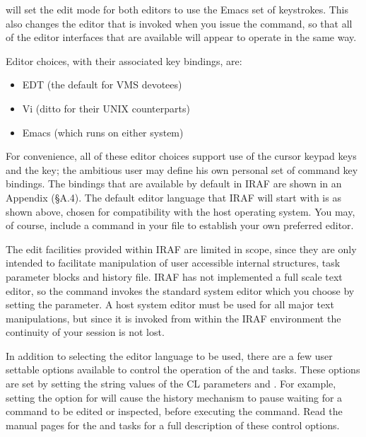 \begin{quotation}\noindent
{} 
\end{quotation}

\noindent
will set the edit mode for both editors to use the Emacs set of keystrokes.
This also changes the editor that is invoked when
you issue the  command, so that all of the editor interfaces
that are available will appear to operate in the same way. 

Editor choices, with their associated key bindings, are:

\begin{itemize}
\item EDT (the default for VMS devotees) 
\item Vi (ditto for their UNIX counterparts)
\item Emacs (which runs on either system)
\end{itemize}

For convenience, all of these editor choices support
use of the cursor keypad keys and the  key; the 
ambitious user may define his own personal set of command key bindings. 
The bindings that are available by default in IRAF are shown in an
Appendix (\S A.4).  The default editor language that IRAF will start 
with is as shown above, chosen for compatibility with the host operating
system.  You may, of course, include a  command in 
your  file to establish your own preferred editor.

The edit facilities provided within IRAF are limited in scope, since
they are only intended to facilitate manipulation of user accessible
internal structures, task parameter blocks and history file. IRAF
has not implemented a full scale text editor, so the 
command invokes the standard system editor which you choose by setting
the  parameter.
A host system editor must be used for all major text manipulations,
but since it is invoked from within the IRAF environment the continuity
of your session is not lost.

In addition to selecting the editor language to be used, there are a few user
settable options available to control the operation of the 
and  tasks.  These options are set by setting the string
values of the CL parameters  and .
For example, setting the  option for 
will cause the history mechanism to pause waiting for a command to be
edited or inspected, before executing the command.
Read the manual pages for the  and  tasks
for a full description of these control options.

